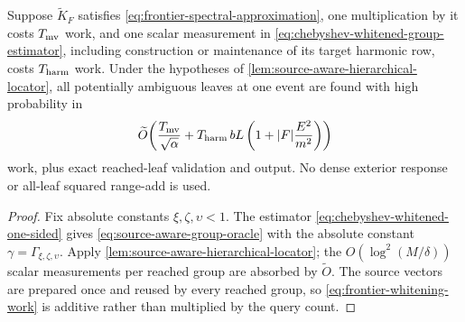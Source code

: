 \begin{corollary}
\label{cor:packed-harmonic-node-tests}
Suppose $\widetilde K_F$ satisfies
\cref{eq:frontier-spectral-approximation}, one multiplication by it costs
$T_{\rm mv}$ work, and one scalar measurement in
\cref{eq:chebyshev-whitened-group-estimator}, including construction or
maintenance of its target harmonic row, costs $T_{\rm harm}$ work.  Under
the hypotheses of \cref{lem:source-aware-hierarchical-locator}, all
potentially ambiguous leaves at one event are found with high probability in
\begin{equation}
 \widetilde O\!\left(
 \frac{T_{\rm mv}}{\sqrt\alpha}
 +
 T_{\rm harm}\,bL
 \left(1+|F|\frac{E^2}{m^2}\right)
 \right)
 \label{eq:packed-harmonic-query-work}
\end{equation}
work, plus exact reached-leaf validation and output.  No dense exterior
response or all-leaf squared range-add is used.
\end{corollary}

\begin{proof}
Fix absolute constants $\xi,\zeta,\upsilon<1$.  The estimator
\cref{eq:chebyshev-whitened-one-sided} gives
\cref{eq:source-aware-group-oracle} with the absolute constant
$\gamma=\Gamma_{\xi,\zeta,\upsilon}$.  Apply
\cref{lem:source-aware-hierarchical-locator}; the
$O(\log^2(M/\delta))$ scalar measurements per reached group are absorbed by
$\widetilde O$.  The source vectors are prepared once and reused by every
reached group, so \cref{eq:frontier-whitening-work} is additive rather than
multiplied by the query count.
\end{proof}


